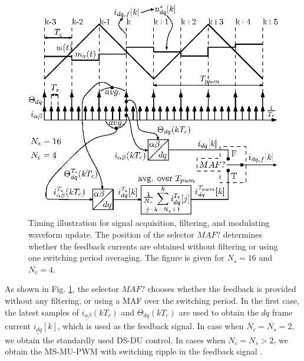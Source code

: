 \documentclass[conference]{IEEEtran}
\begin{document}
\begin{figure}[t!]
    \centerline{\includegraphics[width=0.95\linewidth]{figures/timing_diagram.eps}}
    \caption{Timing illustration for signal acquisition, filtering, and modulating waveform update. The position of the selector $MAF?$ determines whether the feedback currents are obtained without filtering or using one switching period averaging. The figure is given for $N_s = 16$ and $N_c = 4$.}
    \label{fig:timings}
\end{figure}

As shown in Fig. \ref{fig:timings}, the selector $MAF?$ chooses whether the feedback is provided without any filtering, or using a MAF over the switching period. In the first case, the latest samples of $\underline{i_{\alpha \beta}}(kT_c)$ and $\Theta_{dq}(kT_c)$ are used to obtain the $dq$ frame current $\underline{i_{dq}}[k]$, which is used as the feedback signal. In case when $N_c = N_s = 2$, we obtain the standardly used DS-DU control. In cases when $N_c = N_s > 2$, we obtain the MS-MU-PWM with switching ripple in the feedback signal \cite{Petric2020}.
\end{document}
